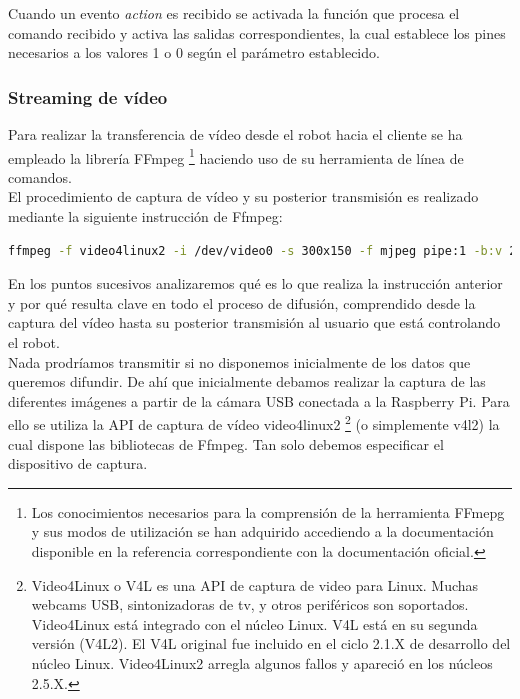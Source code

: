 Cuando un evento \emph{action} es recibido se activada la función que procesa el comando recibido y activa las salidas correspondientes, la cual establece los pines necesarios a los valores
1 o 0 según el parámetro establecido.\\

\subsubsection{ Streaming de vídeo }

Para realizar la transferencia de vídeo desde el robot hacia el cliente se ha empleado la librería FFmpeg \footnote{ Los conocimientos necesarios para la comprensión de la herramienta FFmepg y sus modos de 
utilización se han adquirido accediendo a la documentación disponible en la referencia \cite{website:7} correspondiente con la documentación oficial.} haciendo uso de su herramienta de línea de comandos.\\

El procedimiento de captura de vídeo y su posterior transmisión es realizado mediante la siguiente instrucción de Ffmpeg:\\

\begin{lstlisting}[language=bash]
  ffmpeg -f video4linux2 -i /dev/video0 -s 300x150 -f mjpeg pipe:1 -b:v 28k -bufsize 28k
\end{lstlisting}

En los puntos sucesivos analizaremos qué es lo que realiza la instrucción anterior y por qué resulta clave en todo el proceso de difusión, comprendido desde la captura del 
vídeo hasta su posterior transmisión al usuario que está controlando el robot.\\

Nada prodríamos transmitir si no disponemos inicialmente de los datos que queremos difundir. De ahí que inicialmente debamos realizar la captura de las diferentes imágenes a partir de la cámara
USB conectada a la Raspberry Pi. Para ello se utiliza la API de captura de vídeo video4linux2 \footnote{ Video4Linux o V4L es una API de captura de video para Linux. Muchas webcams USB, sintonizadoras
de tv, y otros periféricos son soportados. Video4Linux está integrado con el núcleo Linux. V4L está en su segunda versión (V4L2). El V4L original fue incluido en el ciclo 2.1.X de desarrollo del
núcleo Linux. Video4Linux2 arregla algunos fallos y apareció en los núcleos 2.5.X. } (o simplemente v4l2) la cual dispone las bibliotecas de Ffmpeg. Tan solo debemos especificar el dispositivo de 
captura.\\

